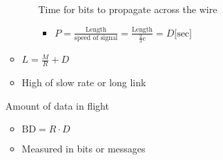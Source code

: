 \begin{itemize}
\begin{itemize}
\begin{itemize}
                     Time for bits to propagate across the wire
                        \begin{itemize}
                            \item $P = \frac{\text{Length}}{\text{speed of signal}} = \frac{\text{Length}}{\frac{2}{3}c} = D \text{[sec]}$
                        \end{itemize}
                \end{itemize}
            \item $L = \frac{M}{R} + D$
            \item High of slow rate or long link
        \end{itemize}
     Amount of data in flight
        \begin{itemize}
            \item $\text{BD} = R \cdot D$
            \item Measured in bits or messages
        \end{itemize}
\end{itemize}


